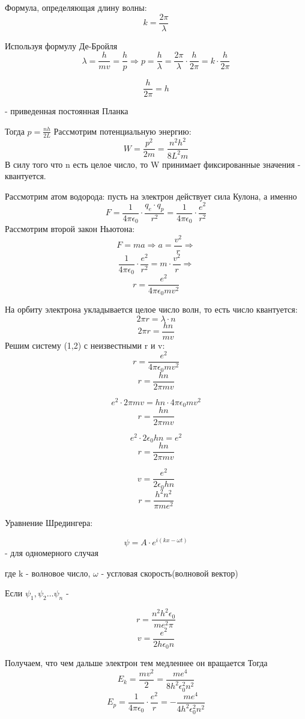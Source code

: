 \documentclass[../main.tex]{subfiles}
\begin{document}
Формула, определяющая длину волны:
\[k = \frac{2 \pi}{\lambda}\]

Используя формулу Де-Бройля 
\[\lambda = \frac{h}{mv} = \frac{h}{p} \Rightarrow p = \frac{h}{\lambda} = \frac{2 \pi}{\lambda} \cdot \frac{h}{2 \pi} = k\cdot \frac{h}{2 \pi}\]

\[\frac{h}{2 \pi} = h\]
\begin{center}
    - приведенная постоянная Планка
\end{center}

Тогда $p = \frac{n h}{2 L}$
Рассмотрим потенциальную энергию:
\[W = \frac{p^2}{2 m} = \frac{n^2 h^2}{8L^2 m}\]
В силу того что n есть целое число, то W принимает фиксированные значения - квантуется.

Рассмотрим атом водорода: пусть на электрон действует сила Кулона, а именно
\[F = \frac{1}{4 \pi \epsilon_0} \cdot \frac{q_e \cdot q_p}{r^2} = \frac{1}{4 \pi \epsilon_0} \cdot \frac{e^2}{r^2}\]
Рассмотрим второй закон Ньютона:
\[F = ma \Rightarrow a = \frac{v^2}{r} \Rightarrow\]
\[\frac{1}{4 \pi \epsilon_0} \cdot \frac{e^2}{r^2} = m \cdot \frac{v^2}{r} \Rightarrow\]
\[r  = \frac{e^2}{4 \pi \epsilon_0 m v^2}\]

На орбиту электрона укладывается целое число волн, то есть число квантуется: 
\[2 \pi r = \lambda \cdot n\]
\[2 \pi r = \frac{h n}{mv}\]
Решим систему (1,2) с неизвестными r и v:
\[r = \frac{e^2}{4 \pi \epsilon_0 m v^2}\]
\[r = \frac{hn}{2 \pi mv}\]

\[e^2 \cdot 2 \pi mv = hn \cdot 4 \pi \epsilon_0 mv^2\]
\[r = \frac{hn}{2 \pi mv}\]

\[e^2 \cdot 2 \epsilon_0 hn = e^2\]
\[r = \frac{hn}{2 \pi mv}\]

\[v = \frac{e^2}{2 \epsilon_0 hn}\]
\[r = \frac{h^2 n^2}{\pi me^2}\]

Уравнение Шредингера:

\[\psi = A \cdot e^{i(kx - \omega t)}\] - для одномерного случая

\begin{center}
    где k - волновое число, $\omega$ - усгловая скорость(волновой вектор)
\end{center}
Если $\psi_1, \psi_2 \ldots \psi_n$ - 

\[r = \frac{n^2 h^2 \epsilon_0}{m e^2 \pi}\]
\[v = \frac{e^2}{2h \epsilon_0 n}\]

Получаем, что чем дальше электрон тем медленнее он вращается
Тогда
\[E_k = \frac{mv^2}{2} = \frac{me^4}{8h^2 \epsilon_0^2 n^2}\]
\[E_p = \frac{1}{4 \pi \epsilon_0} \cdot \frac{e^2}{r} = - \frac{m e^4}{4 h^2 \epsilon_0^2 n^2}\]
\end{document}

